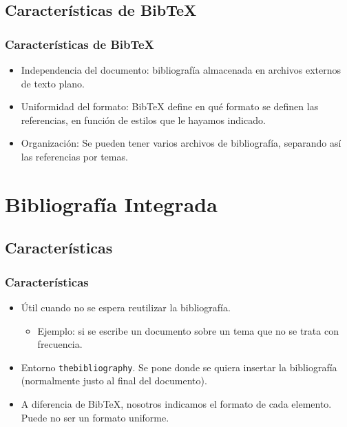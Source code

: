 \documentclass[aspectratio=1610]{beamer}%
\begin{document}
\subsection{Características de Bib\TeX{}}
\begin{frame}[fragile]
\frametitle{\textbf{Características de Bib\TeX{}}}
\justifying
 \begin{itemize}\justifying
  \item Independencia del documento: bibliografía almacenada en archivos externos de texto plano.
  \item Uniformidad del formato: Bib\TeX{} define en qué formato se definen las referencias, en función de estilos que le hayamos indicado.
  \item Organización: Se pueden tener varios archivos de bibliografía, separando así las referencias por temas.
\end{itemize}
\end{frame}


\section{Bibliografía Integrada}
\subsection{Características}
\begin{frame}[fragile]
\frametitle{\textbf{Características}}
\justifying
 \begin{itemize}\justifying
  \item Útil cuando no se espera reutilizar la bibliografía.
  \begin{itemize}\justifying
  \item[] Ejemplo: si se escribe un documento sobre un tema que no se trata con frecuencia.
\end{itemize}

  \item Entorno \texttt{thebibliography}. Se pone donde se quiera insertar la bibliografía (normalmente justo al final del documento).
  \item A diferencia de Bib\TeX{}, nosotros indicamos el formato de cada elemento. Puede no ser un formato uniforme.
\end{itemize}

\end{frame}
\end{document}
